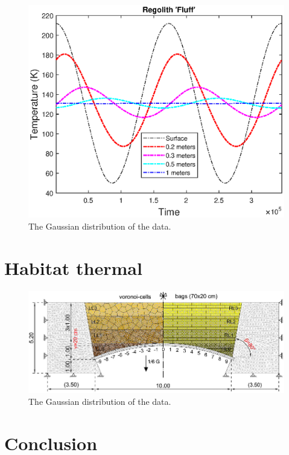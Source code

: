 \documentclass[prl,twocolumn]{revtex4-1}  %
\begin{document}
\begin{figure}[!h]
\centering
\includegraphics[width = \linewidth]{Processed_Regolith.eps}
\caption{ The Gaussian distribution of the data. }
\end{figure}
\section{Habitat thermal}

\begin{figure}[!h]
\centering
\includegraphics[width = \linewidth]{bags.eps}
\caption{ The Gaussian distribution of the data. }
\end{figure}



\section{Conclusion}

\appendix*   %
\end{document}
